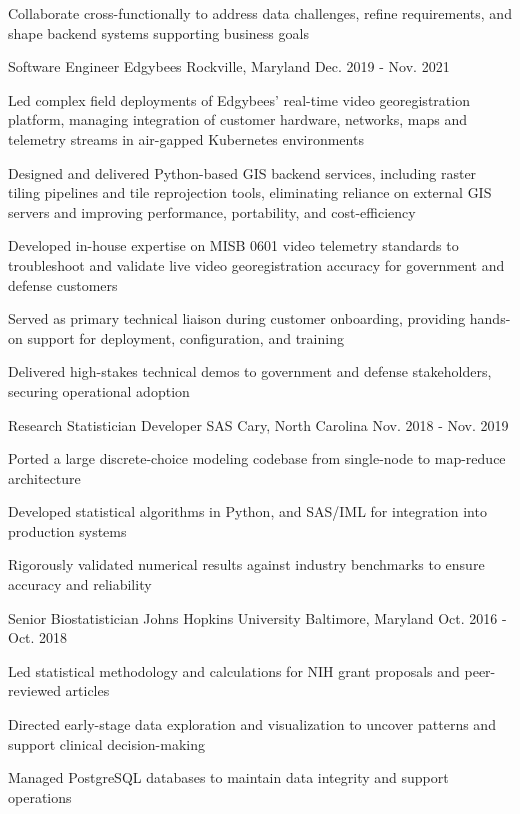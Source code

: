 \begin{cventries}
{\begin{cvitems}
    \item {Collaborate cross-functionally to address data challenges, refine requirements, and shape backend systems supporting business goals}
  \end{cvitems}
}
\cventry
{Software Engineer} %
{Edgybees} %
{Rockville, Maryland} %
{Dec. 2019 - Nov. 2021} %
{
  \begin{cvitems} %
  \item {Led complex field deployments of Edgybees’ real-time video georegistration platform, managing integration of customer hardware, networks, maps and telemetry streams in air-gapped Kubernetes environments}
  \item {Designed and delivered Python-based GIS backend services, including raster tiling pipelines and tile reprojection tools, eliminating reliance on external GIS servers and improving performance, portability, and cost-efficiency}
  \item {Developed in-house expertise on MISB 0601 video telemetry standards to troubleshoot and validate live video georegistration accuracy for government and defense customers}
  \item {Served as primary technical liaison during customer onboarding, providing hands-on support for deployment, configuration, and training}
  \item {Delivered high-stakes technical demos to government and defense stakeholders, securing operational adoption}
\end{cvitems}
}

\cventry
{Research Statistician Developer} %
{SAS} %
{Cary, North Carolina} %
{Nov. 2018 - Nov. 2019} %
{
  \begin{cvitems}
    \item {Ported a large discrete-choice modeling codebase from single-node to map-reduce architecture}
    \item {Developed statistical algorithms in Python, and SAS/IML for integration into production systems}
    \item {Rigorously validated numerical results against industry benchmarks to ensure accuracy and reliability}  
  \end{cvitems}
}

\cventry
{Senior Biostatistician} %
{Johns Hopkins University} %
{Baltimore, Maryland} %
{Oct. 2016 - Oct. 2018} %
{
  \begin{cvitems}
    \item {Led statistical methodology and calculations for NIH grant proposals and peer-reviewed articles}
    \item {Directed early-stage data exploration and visualization to uncover patterns and support clinical decision-making}
    \item {Managed PostgreSQL databases to maintain data integrity and support operations}
  \end{cvitems}
}


\end{cventries}

